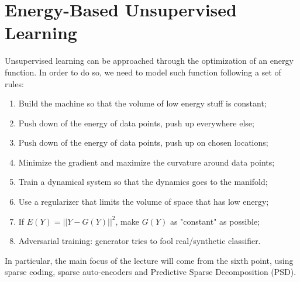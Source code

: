 \documentclass[12pt,letterpaper]{article}
\begin{document}
\section*{Energy-Based Unsupervised Learning}
Unsupervised learning can be approached through the optimization of an energy function. In order to do so, we need to model such function following a set of rules:
\begin{enumerate}
    \item Build the machine so that the volume of low energy stuff is constant;
    \item Push down of the energy of data points, push up everywhere else;
    \item Push down of the energy of data points, push up on chosen locations;
    \item Minimize the gradient and maximize the curvature around data points;
    \item Train a dynamical system so that the dynamics goes to the manifold;
    \item Use a regularizer that limits the volume of space that has low energy;
    \item If $E(Y) = ||Y - G(Y)||^2$, make $G(Y)$ as "constant" as possible;
    \item Adversarial training: generator tries to fool real/synthetic classifier.
\end{enumerate}%


In particular, the main focus of the lecture will come from the sixth point, using sparse coding, sparse auto-encoders and Predictive Sparse Decomposition (PSD).
\end{document}
